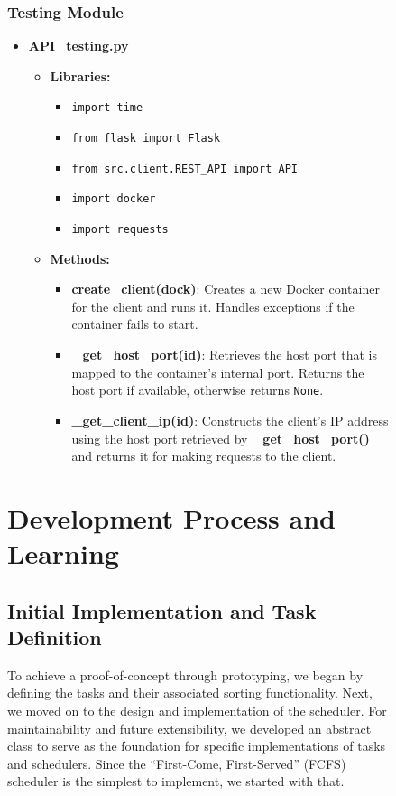 \documentclass{article}
\begin{document}
\begin{figure}[h!]
\subsubsection{Testing Module}
    \begin{itemize}
        \item \textbf{API\_testing.py}
        \begin{itemize}
            \item \textbf{Libraries:}
            \begin{itemize}
                \item \texttt{import time}
                \item \texttt{from flask import Flask}
                \item \texttt{from src.client.REST\_API import API}
                \item \texttt{import docker}
                \item \texttt{import requests}
            \end{itemize}
            \item \textbf{Methods:}
            \begin{itemize}
                \item \textbf{create\_client(dock)}: Creates a new Docker container for the client and runs it. Handles exceptions if the container fails to start.
                \item \textbf{\_get\_host\_port(id)}: Retrieves the host port that is mapped to the container's internal port. Returns the host port if available, otherwise returns \texttt{None}.
                \item \textbf{\_get\_client\_ip(id)}: Constructs the client's IP address using the host port retrieved by \textbf{\_get\_host\_port()} and returns it for making requests to the client.
            \end{itemize}
        \end{itemize}
    \end{itemize}

\section{Development Process and Learning}
\subsection{Initial Implementation and Task Definition}
To achieve a proof-of-concept through prototyping, we began by defining the tasks and their associated sorting functionality. Next, we moved on to the design and implementation of the scheduler. For maintainability and future extensibility, we developed an abstract class to serve as the foundation for specific implementations of tasks and schedulers. Since the “First-Come, First-Served” (FCFS) scheduler is the simplest to implement, we started with that.


\end{figure}
\end{document}
